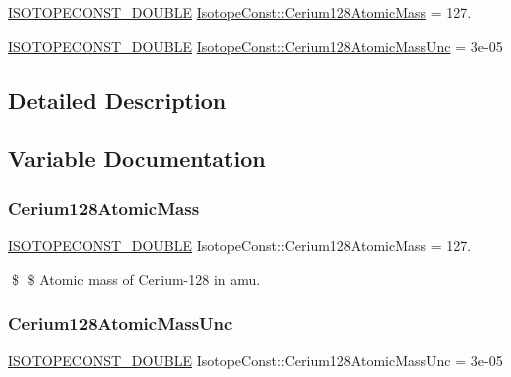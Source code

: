 \begin{DoxyCompactItemize}
\item 
\mbox{\hyperlink{group___isotope_const-_macros_ga8f45a7272ce02c0b4c65c44636ed719a}{I\+S\+O\+T\+O\+P\+E\+C\+O\+N\+S\+T\+\_\+\+D\+O\+U\+B\+LE}} \mbox{\hyperlink{group___isotope_const-_cerium-_ce128_ga66e243ccfd306c5331ee162d06c574bb}{Isotope\+Const\+::\+Cerium128\+Atomic\+Mass}} = 127.
\item 
\mbox{\hyperlink{group___isotope_const-_macros_ga8f45a7272ce02c0b4c65c44636ed719a}{I\+S\+O\+T\+O\+P\+E\+C\+O\+N\+S\+T\+\_\+\+D\+O\+U\+B\+LE}} \mbox{\hyperlink{group___isotope_const-_cerium-_ce128_ga02243ca58cf0f324a5fbc7c04474a89a}{Isotope\+Const\+::\+Cerium128\+Atomic\+Mass\+Unc}} = 3e-\/05
\end{DoxyCompactItemize}


\subsection{Detailed Description}


\subsection{Variable Documentation}
\mbox{\label{group___isotope_const-_cerium-_ce128_ga66e243ccfd306c5331ee162d06c574bb}} 
\subsubsection{\texorpdfstring{Cerium128\+Atomic\+Mass}{Cerium128AtomicMass}}
{\footnotesize\ttfamily \mbox{\hyperlink{group___isotope_const-_macros_ga8f45a7272ce02c0b4c65c44636ed719a}{I\+S\+O\+T\+O\+P\+E\+C\+O\+N\+S\+T\+\_\+\+D\+O\+U\+B\+LE}} Isotope\+Const\+::\+Cerium128\+Atomic\+Mass = 127.}

\$ \$ Atomic mass of Cerium-\/128 in amu. \mbox{\label{group___isotope_const-_cerium-_ce128_ga02243ca58cf0f324a5fbc7c04474a89a}} 
\subsubsection{\texorpdfstring{Cerium128\+Atomic\+Mass\+Unc}{Cerium128AtomicMassUnc}}
{\footnotesize\ttfamily \mbox{\hyperlink{group___isotope_const-_macros_ga8f45a7272ce02c0b4c65c44636ed719a}{I\+S\+O\+T\+O\+P\+E\+C\+O\+N\+S\+T\+\_\+\+D\+O\+U\+B\+LE}} Isotope\+Const\+::\+Cerium128\+Atomic\+Mass\+Unc = 3e-\/05}

